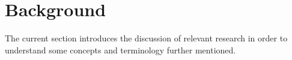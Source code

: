 \section{Background} \label{sec:background}

The current section introduces the discussion of relevant research in order to understand some concepts and terminology further mentioned.




